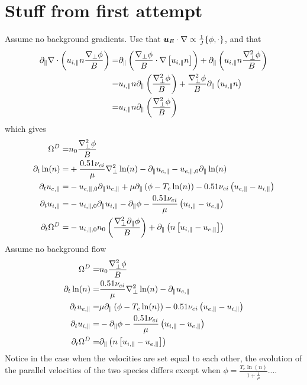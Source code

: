 \section{Stuff from first attempt}
Assume no background gradients. Use that $\boldsymbol{u}_E\cdot\nabla \propto
\frac{1}{J}\{\phi,\cdot\}$, and that
\begin{align*}
  \partial_\|\nabla\cdot \left( u_{i,\|}n \frac{\nabla_\perp \phi}{B}\right)
  =&
  \partial_\|\left(\frac{\nabla_\perp \phi}{B}\cdot\nabla \left[ u_{i,\|}n \right]\right)
  +
  \partial_\|\left(u_{i,\|}n  \frac{\nabla_\perp^2 \phi}{B}\right)
  \\
  =&
  u_{i,\|}n \partial_\|\left(\frac{\nabla_\perp^2 \phi}{B}\right)
  +
  \frac{\nabla_\perp^2 \phi}{B} \partial_\|\left(u_{i,\|}n  \right)
  \\
  =&
  u_{i,\|}n \partial_\|\left(\frac{\nabla_\perp^2 \phi}{B}\right)
\end{align*}
which gives
\begin{align*}
\Om^D =&
n_0\frac{\grad_\perp^2\phi}{B}
\\
%
%
%
\partial_t \ln(n)
=&
 +\frac{0.51\nu_{ei}}{\mu}
   \grad_\perp^2 \ln(n)
- \partial_\|u_{e,\|}
- u_{e,\|,0} \partial_\| \ln(n)
\\
%
%
%
\partial_t u_{e,\|}
 =&
 - u_{e,\|,0} \partial_\| u_{e,\|}
 + \mu \partial_\| \L(\phi - T_e  \ln(n)\R)
 - 0.51 \nu_{ei} \L(u_{e,\|}-u_{i,\|}\R)
\\
%
%
%
\partial_t u_{i,\|}
 =&
 - u_{i,\|,0} \partial_\| u_{i,\|}
 - \partial_\|\phi
 - \frac{ 0.51 \nu_{ei} }{ \mu } \L(u_{i,\|}-u_{e,\|}\R)
\\
%
%
%
  \partial_t \Om^D
  =&
  - u_{i,\|,0}n_0 \L(\frac{\grad_\perp^2 \partial_\| \phi}{B}\R)
 + \partial_\| \L(n\L[ u_{i,\|} - u_{e,\|} \R]\R)
\end{align*}
Assume no background flow
\begin{align*}
\Om^D =&
n_0\frac{\grad_\perp^2\phi}{B}
\\
%
%
%
\partial_t \ln(n)
=&
 \frac{0.51\nu_{ei}}{\mu}
   \grad_\perp^2 \ln(n)
- \partial_\|u_{e,\|}
\\
%
%
%
\partial_t u_{e,\|}
 =&
 \mu \partial_\| \L(\phi - T_e  \ln(n)\R)
 - 0.51 \nu_{ei} \L(u_{e,\|}-u_{i,\|}\R)
\\
%
%
%
\partial_t u_{i,\|}
 =&
 - \partial_\|\phi
 - \frac{ 0.51 \nu_{ei} }{ \mu } \L(u_{i,\|}-u_{e,\|}\R)
\\
%
%
%
  \partial_t \Om^D
  =&
 \partial_\| \L(n\L[ u_{i,\|} - u_{e,\|} \R]\R)
\end{align*}
Notice in the case when the velocities are set equal to each other, the
evolution of the parallel velocities of the two species differs except when
$\phi = \frac{T_e\ln(n)}{1+\frac{1}{\mu}}$....

